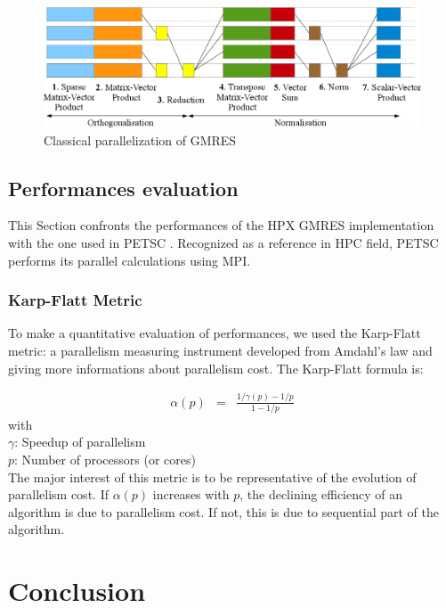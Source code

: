 \documentclass{llncs}
\begin{document}
\begin{figure}[h]
\begin{center}
\includegraphics[scale=0.33]{Images/Im6.png}
\end{center}
\caption{Classical parallelization of GMRES}
\label{pargmres}
\end{figure}

\subsection{Performances evaluation}
This Section confronts the performances of the HPX GMRES implementation with
the one used in PETSC \cite{Petsc}. Recognized as a reference in HPC field,
PETSC performs its parallel calculations using MPI.

\subsubsection{Karp-Flatt Metric}
To make a quantitative evaluation of performances, we used the Karp-Flatt
metric: a parallelism measuring instrument developed from Amdahl's law and
giving more informations about parallelism cost. The Karp-Flatt formula is:

\begin{eqnarray}
\alpha(p) &=&\frac{1/\gamma(p) - 1/p}{1-1/p} \label{KarpFlatt}
\end{eqnarray}
with\\
$\gamma$: Speedup of parallelism\\
$p$: Number of processors (or cores)\\

The major interest of this metric is to be representative of the evolution of
parallelism cost. If $\alpha(p)$ increases with $p$, the declining efficiency
of an algorithm is due to parallelism cost. If not, this is due to sequential
part of the algorithm.

\section{Conclusion}



\end{document}

